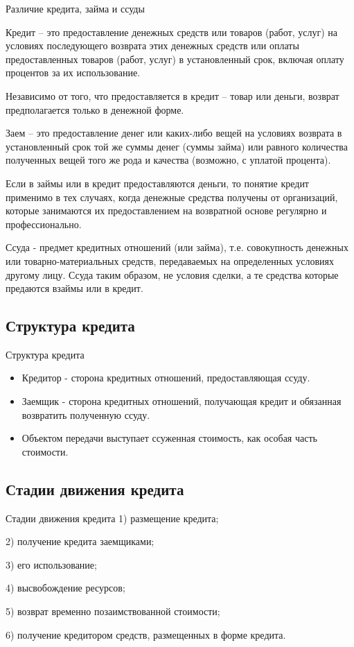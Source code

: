 \documentclass[_DKB_p2_Credit.tex]{subfiles}
\begin{document}
\begin{frame}[allowframebreaks]{Различие кредита, займа и ссуды}
\begin{block}{Кредит }
\quad
– это предоставление денежных средств или товаров (работ, услуг) на условиях последующего возврата этих денежных средств или оплаты предоставленных товаров (работ, услуг) в установленный срок, включая оплату процентов за их использование.
\end{block}
Независимо от того, что предоставляется в кредит – товар или деньги, возврат предполагается только в денежной форме.
\pagebreak

\begin{block}{Заем }
\quad 
– это предоставление денег или каких-либо вещей на условиях возврата в установленный срок той же суммы денег (суммы займа) или равного количества полученных вещей того же рода и качества (возможно, с уплатой процента).
\end{block}
Если в займы или в кредит предоставляются деньги, то понятие кредит применимо в тех случаях, когда денежные средства получены от организаций, которые занимаются их предоставлением на возвратной основе регулярно и профессионально.
\pagebreak
\begin{block}{Ссуда}
\quad
- предмет кредитных отношений (или займа), т.е. совокупность денежных или товарно-материальных средств, передаваемых на определенных условиях другому лицу. Ссуда таким образом, не условия сделки, а те средства которые предаются взаймы или в кредит.
\end{block}
\end{frame}

\subsection{Структура кредита}
\begin{frame}{Структура кредита}
\begin{itemize}
\item
Кредитор - сторона кредитных отношений, предоставляющая ссуду. 
\item
Заемщик - сторона кредитных отношений, получающая кредит и обязанная возвратить полученную ссуду.
\item
Объектом передачи выступает ссуженная стоимость, как особая часть стоимости. 
\end{itemize}
\end{frame}
\subsection{Стадии движения кредита}
\begin{frame}{Стадии движения кредита}
1) размещение кредита;

2) получение кредита заемщиками;

3) его использование;

4) высвобождение ресурсов;

5) возврат временно позаимствованной стоимости;

6) получение кредитором средств, размещенных в форме кредита.

\end{frame}
\end{document}
